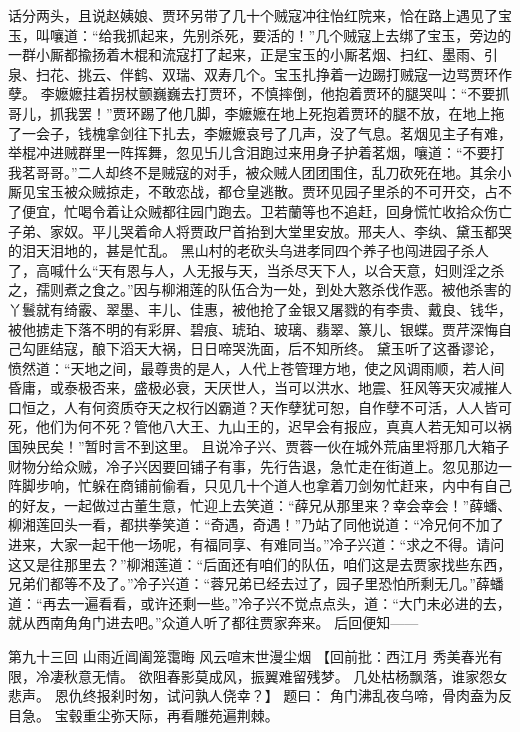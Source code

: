 \documentclass[12pt,oneside]{book}
\begin{document}
话分两头，且说赵姨娘、贾环另带了几十个贼寇冲往怡红院来，恰在路上遇见了宝玉，叫嚷道：“给我抓起来，先别杀死，要活的！”几个贼寇上去绑了宝玉，旁边的一群小厮都揄扬着木棍和流寇打了起来，正是宝玉的小厮茗烟、扫红、墨雨、引泉、扫花、挑云、伴鹤、双瑞、双寿几个。宝玉扎挣着一边踢打贼寇一边骂贾环作孽。
李嬷嬷拄着拐杖颤巍巍去打贾环，不慎摔倒，他抱着贾环的腿哭叫：“不要抓哥儿，抓我罢！”贾环踢了他几脚，李嬷嬷在地上死抱着贾环的腿不放，在地上拖了一会子，钱槐拿剑往下扎去，李嬷嬷哀号了几声，没了气息。茗烟见主子有难，举棍冲进贼群里一阵挥舞，忽见卐儿含泪跑过来用身子护着茗烟，嚷道：“不要打我茗哥哥。”二人却终不是贼寇的对手，被众贼人团团围住，乱刀砍死在地。其余小厮见宝玉被众贼掠走，不敢恋战，都仓皇逃散。贾环见园子里杀的不可开交，占不了便宜，忙喝令着让众贼都往园门跑去。卫若蘭等也不追赶，回身慌忙收拾众伤亡子弟、家奴。平儿哭着命人将贾政尸首抬到大堂里安放。邢夫人、李纨、黛玉都哭的泪天泪地的，甚是忙乱。
黑山村的老砍头乌进孝同四个养子也闯进园子杀人了，高喊什么“天有恩与人，人无报与天，当杀尽天下人，以合天意，妇则淫之杀之，孺则煮之食之。”因与柳湘莲的队伍合为一处，到处大憝杀伐作恶。被他杀害的丫鬟就有绮霰、翠墨、丰儿、佳惠，被他抢了金银又屠戮的有李贵、戴良、钱华，被他掳走下落不明的有彩屏、碧痕、琥珀、玻璃、翡翠、篆儿、银蝶。贾芹深悔自己勾匪结寇，酿下滔天大祸，日日啼哭洗面，后不知所终。
黛玉听了这番谬论，愤然道：“天地之间，最尊贵的是人，人代上苍管理方地，使之风调雨顺，若人间昏庸，或泰极否来，盛极必衰，天厌世人，当可以洪水、地震、狂风等天灾减摧人口恒之，人有何资质夺天之权行凶霸道？天作孽犹可恕，自作孽不可活，人人皆可死，他们为何不死？管他八大王、九山王的，迟早会有报应，真真人若无知可以祸国殃民矣！”暂时言不到这里。
且说冷子兴、贾蓉一伙在城外荒庙里将那几大箱子财物分给众贼，冷子兴因要回铺子有事，先行告退，急忙走在街道上。忽见那边一阵脚步响，忙躲在商铺前偷看，只见几十个道人也拿着刀剑匆忙赶来，内中有自己的好友，一起做过古董生意，忙迎上去笑道：“薛兄从那里来？幸会幸会！”薛蟠、柳湘莲回头一看，都拱拳笑道：“奇遇，奇遇！”乃站了同他说道：“冷兄何不加了进来，大家一起干他一场呢，有福同享、有难同当。”冷子兴道：“求之不得。请问这又是往那里去？”柳湘莲道：“后面还有咱们的队伍，咱们这是去贾家找些东西，兄弟们都等不及了。”冷子兴道：“蓉兄弟已经去过了，园子里恐怕所剩无几。”薛蟠道：“再去一遍看看，或许还剩一些。”冷子兴不觉点点头，道：“大门未必进的去，就从西南角角门进去吧。”众道人听了都往贾家奔来。
后回便知——


 
第九十三回 山雨近阊阖笼霭晦 风云喧末世漫尘烟
【回前批：西江月 
秀美春光有限，冷凄秋意无情。
欲阻春影莫成风，振翼难留残梦。
几处枯杨飘落，谁家怨女悲声。
恩仇终报刹时匆，试问孰人侥幸？】
题曰：
角门沸乱夜乌啼，骨肉盍为反目急。
宝毂重尘弥天际，再看雕苑遍荆棘。
\end{document}
